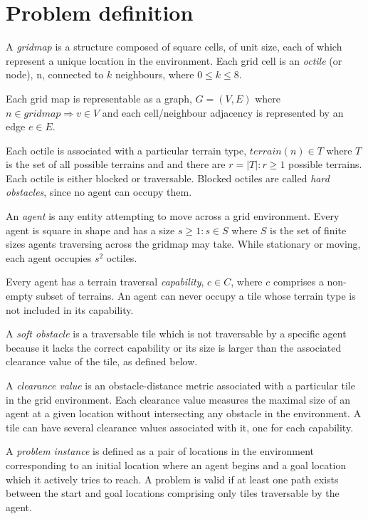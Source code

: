 \section{Problem definition}
A \emph{gridmap} is a structure composed of square cells, of unit size, each of which represent a unique location in the environment. 
Each grid cell is an \emph{octile} (or node), n, connected to $k$ neighbours, where  $0 \leq k \leq 8$. 
\par \indent
Each grid map is representable as a graph, $G = (V, E)$ where $n \in gridmap \Rightarrow v \in V$ and each cell/neighbour adjacency is represented by an edge $e \in E$.
\par \indent
Each octile is associated with a particular terrain type, $terrain(n) \in T$ where $T$ is the set of all possible terrains and and there are $r = |T| : r \geq 1$ possible terrains.
Each octile is either blocked or traversable. 
Blocked octiles are called \emph{hard obstacles}, since no agent can occupy them.
\par \indent
An \emph{agent} is any entity attempting to move across a grid environment. 
Every agent is square in shape and has a size $s \geq 1 : s \in S$ where $S$ is the set of finite sizes agents traversing across the gridmap may take.
While stationary or moving, each agent occupies $s^2$ octiles. 
\par \indent
Every agent has a terrain traversal \emph{capability}, $c \in C$, where $c$ comprises a non-empty subset of terrains.
An agent can never occupy a tile whose terrain type is not included in its capability.
\par \indent 
A \emph{soft obstacle} is a traversable tile which is not traversable by a specific agent because it lacks the correct capability or its size is larger than the associated clearance value of the tile, as defined below. 
\par \indent
A \emph{clearance value} is an obstacle-distance metric associated with a particular tile in the grid environment. 
Each clearance value measures the maximal size of an agent at a given location without intersecting any obstacle in the environment. 
A tile can have several clearance values associated with it, one for each capability. 
\par \indent
A \emph{problem instance} is defined as a pair of locations in the environment corresponding to an initial location where an agent begins and a goal location which it actively tries to reach. A problem is valid if at least one path exists between the start and goal locations comprising only tiles traversable by the agent. 
